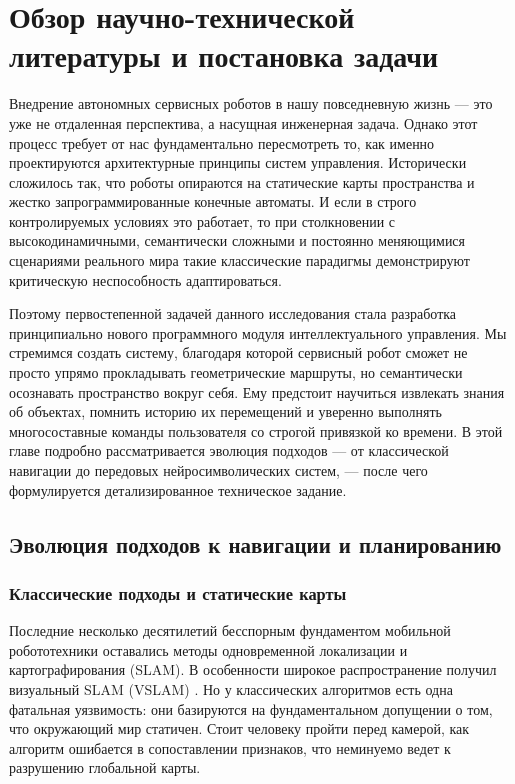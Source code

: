 \chapter{Обзор научно-технической литературы и постановка задачи}
\label{ch:review}

Внедрение автономных сервисных роботов в нашу повседневную жизнь — это уже не отдаленная перспектива, а насущная инженерная задача. Однако этот процесс требует от нас фундаментально пересмотреть то, как именно проектируются архитектурные принципы систем управления. Исторически сложилось так, что роботы опираются на статические карты пространства и жестко запрограммированные конечные автоматы. И если в строго контролируемых условиях это работает, то при столкновении с высокодинамичными, семантически сложными и постоянно меняющимися сценариями реального мира такие классические парадигмы демонстрируют критическую неспособность адаптироваться.

Поэтому первостепенной задачей данного исследования стала разработка принципиально нового программного модуля интеллектуального управления. Мы стремимся создать систему, благодаря которой сервисный робот сможет не просто упрямо прокладывать геометрические маршруты, но семантически осознавать пространство вокруг себя. Ему предстоит научиться извлекать знания об объектах, помнить историю их перемещений и уверенно выполнять многосоставные команды пользователя со строгой привязкой ко времени. В этой главе подробно рассматривается эволюция подходов — от классической навигации до передовых нейросимволических систем, — после чего формулируется детализированное техническое задание.

\section{Эволюция подходов к навигации и планированию}

\subsection{Классические подходы и статические карты}

Последние несколько десятилетий бесспорным фундаментом мобильной робототехники оставались методы одновременной локализации и картографирования (SLAM). В особенности широкое распространение получил визуальный SLAM (VSLAM) \cite{ref1, ref2}. Но у классических алгоритмов есть одна фатальная уязвимость: они базируются на фундаментальном допущении о том, что окружающий мир статичен. Стоит человеку пройти перед камерой, как алгоритм ошибается в сопоставлении признаков, что неминуемо ведет к разрушению глобальной карты.

